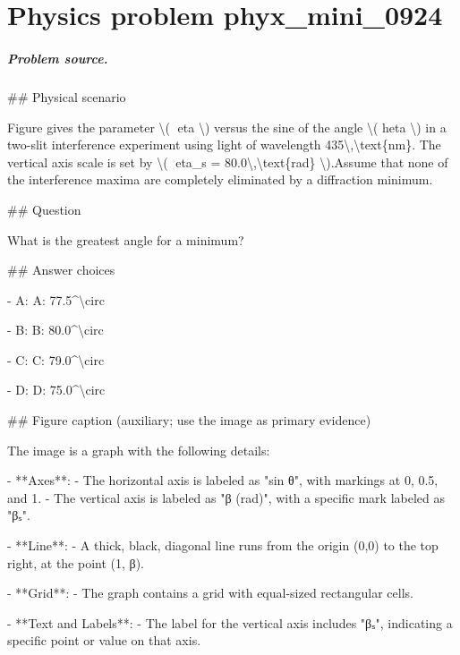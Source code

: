 
\chapter{Physics problem phyx\_mini\_0924}
\label{ch:PhyXMiniProblems_problem_phyx_mini_0924}

\paragraph{Problem source.}
\#\# Physical scenario

Figure gives the parameter \textbackslash{}( eta \textbackslash{}) versus the sine of the angle \textbackslash{}( 	heta \textbackslash{}) in a two-slit interference experiment using light of wavelength 435\textbackslash{},\textbackslash{}text\{nm\}. The vertical axis scale is set by \textbackslash{}( eta\_s = 80.0\textbackslash{},\textbackslash{}text\{rad\} \textbackslash{}).Assume that none of the interference maxima are completely eliminated by a diffraction minimum.

\#\# Question

What is the greatest angle for a minimum?

\#\# Answer choices

- A: A: 77.5\textasciicircum{}\textbackslash{}circ

- B: B: 80.0\textasciicircum{}\textbackslash{}circ

- C: C: 79.0\textasciicircum{}\textbackslash{}circ

- D: D: 75.0\textasciicircum{}\textbackslash{}circ

\#\# Figure caption (auxiliary; use the image as primary evidence)

The image is a graph with the following details:

- **Axes**: 
  - The horizontal axis is labeled as "sin θ", with markings at 0, 0.5, and 1.
  - The vertical axis is labeled as "β (rad)", with a specific mark labeled as "βₛ".

- **Line**:
  - A thick, black, diagonal line runs from the origin (0,0) to the top right, at the point (1, β).

- **Grid**:
  - The graph contains a grid with equal-sized rectangular cells.

- **Text and Labels**:
  - The label for the vertical axis includes "βₛ", indicating a specific point or value on that axis.

